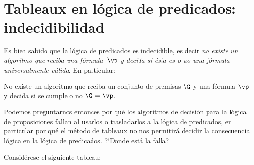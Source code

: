 \documentclass[11pt,letterpaper]{article}
\begin{document}
\section{Tableaux en lógica de predicados: indecidibilidad}

Es bien sabido que la lógica de predicados es indecidible, es decir 
\textit{no existe un algoritmo que reciba una fórmula~$\vp$ y decida si ésta
es o no una fórmula universalmente válida}. En particular:
\bi
\item No existe un algoritmo que reciba un conjunto de premisas $\G$ y
una fórmula $\vp$ y decida si se cumple o no $\G\models\vp$.
\item Podemos preguntarnos entonces por qu\'e los algoritmos de decisión para
  la lógica de proposiciones fallan al usarlos o trasladarlos a la l\'ogica de 
  predicados, en particular por qu\'e el método de tableaux no nos permitirá 
  decidir la consecuencia lógica en la lógica de predicados. 
  ?`Donde está la falla?
\ei

Considérese el siguiente tableau:
\begin{center}
\end{center}

         
\end{document}
